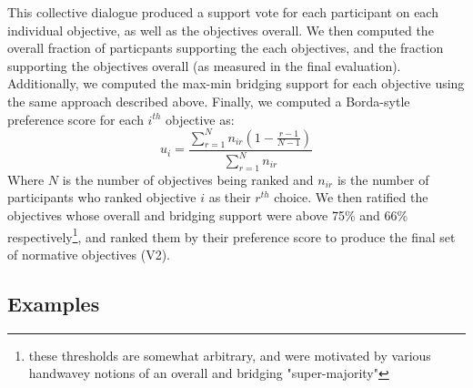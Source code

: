 \documentclass{article}
\begin{document}
This collective dialogue produced a support vote for each participant on each individual objective, as well as the objectives overall. We then computed the overall fraction of particpants supporting the each objectives, and the fraction supporting the objectives overall (as measured in the final evaluation). Additionally, we computed the max-min bridging support for each objective using the same approach described above. Finally, we computed a Borda-sytle preference score \cite{borda1781elections} for each $i^{th}$ objective as:
\begin{equation}
    u_i = \frac{\sum_{r=1}^N n_{ir}(1-\frac{r-1}{N-1})}{\sum_{r=1}^N n_{ir}}
\end{equation}
Where $N$ is the number of objectives being ranked and $n_{ir}$ is the number of participants who ranked objective $i$ as their $r^{th}$ choice. We then ratified the objectives whose overall and bridging support were above 75\% and 66\% respectively\footnote{these thresholds are somewhat arbitrary, and were motivated by various handwavey notions of an overall and bridging "super-majority"}, and ranked them by their preference score to produce the final set of normative objectives (V2). 
\clearpage


\subsection{Examples}
\label{A:examples}
\end{document}
